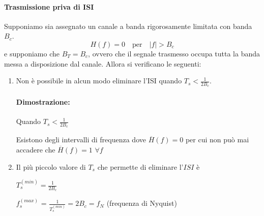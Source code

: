 \paragraph*{Trasmissione priva di ISI}
Supponiamo sia assegnato un canale a banda rigorosamente limitata con banda \( B_c \).
\[ H(f) = 0 \quad \text{per} \quad |f| > B_c \]
e supponiamo che \( B_T = B_c \), ovvero che il segnale trasmesso occupa tutta la banda messa a disposizione dal canale.
Allora si verificano le seguenti:
\begin{enumerate}
    \item Non è possibile in alcun modo eliminare l'ISI quando \( T_s < \frac{1}{2B_c} \).


          \paragraph*{Dimostrazione:}

          Quando \( T_s < \frac{1}{2B_c} \)


          Esistono degli intervalli di frequenza dove \( \overline{H}(f) = 0 \) per cui non può mai accadere che \( \overline{H}(f) = 1 \) \( \forall f \)

          \bigskip

    \item Il più piccolo valore di \( T_s \) che permette di eliminare l'\( ISI \) è

          \( T_s^{(min)} = \frac{1}{2B_c} \)

          \bigskip

          \( f_s^{(max)}\) = \( \frac{1}{T_s^{(min)}} = 2B_c = f_N \) \quad (frequenza di Nyquist)


\end{enumerate}
